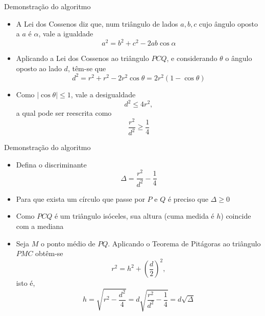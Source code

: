 \begin{frame}[fragile]{Demonstração do algoritmo}

    \begin{itemize}
        \item A Lei dos Cossenos diz que, num triângulo de lados $a, b, c$ cujo ângulo oposto
            a $a$ é $\alpha$, vale a igualdade
            \[
                a^2 = b^2 + c^2 - 2ab\cos \alpha
            \]

        \item Aplicando a Lei dos Cossenos ao triângulo $PCQ$, e considerando $\theta$
            o ângulo oposto ao lado $d$, têm-se que
        \[
            d^2 = r^2 + r^2 - 2r^2\cos \theta = 2r^2(1 - \cos \theta)
        \]

        \item Como $|\cos\theta| \leq 1$, vale a desigualdade
        \[
            d^2 \leq 4r^2,
        \]
        a qual pode ser reescrita como
        \[
            \frac{r^2}{d^2} \geq \frac{1}{4}
        \]
    \end{itemize}

\end{frame}

\begin{frame}[fragile]{Demonstração do algoritmo}

    \begin{itemize}
        \item Defina o discriminante
        \[
            \Delta = \frac{r^2}{d^2} - \frac{1}{4}
        \]

        \item Para que exista um círculo que passe por $P$ e $Q$ é preciso que $\Delta \geq 0$
    
        \item Como $PCQ$ é um triângulo isóceles, sua altura (cuma medida é $h$) coincide com a 
            mediana

        \item Seja $M$ o ponto médio de $PQ$. Aplicando o Teorema de Pitágoras ao triângulo $PMC$
            obtêm-se
        \[
            r^2 = h^2 + \left(\frac{d}{2}\right)^2, 
        \]
        isto é,
        \[
            h = \sqrt{r^2 - \frac{d^2}{4}} = d\sqrt{\frac{r^2}{d^2} - \frac{1}{4}} = d\sqrt{\Delta}
        \]
    \end{itemize}

\end{frame}


